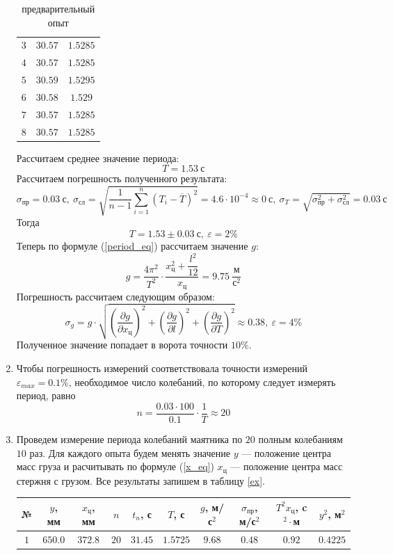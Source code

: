 \documentclass[12pt]{article}
\begin{document}
\begin{enumerate}[label={\textbf{\arabic*.}}]
\begin{table}[h]
\begin{tabular}{|c|c|c|}
				$3$ & $30.57$ &	$1.5285$ \\
				$4$ & $30.57$ &	$1.5285$ \\
				$5$ & $30.59$ &	$1.5295$ \\
				$6$ & $30.58$ &	$1.529$  \\
				$7$ & $30.57$ &	$1.5285$ \\
				$8$ & $30.57$ &	$1.5285$ \\ \hline	
			\end{tabular}
			\caption{предварительный опыт}
			\label{null_ex}
		\end{table}
		Рассчитаем среднее значение периода:
		$$
		T = 1.53~\text{с}
		$$
		Рассчитаем погрешность полученного результата:
		$$
		\sigma_{\text{пр}} = 0.03~\text{с},~\sigma_{\text{сл}} = \sqrt{\frac{1}{n-1}\sum_{i=1}^n \left(T_i - \overline{T}\right)^2} = 4.6\cdot10^{-4} \approx 0~\text{с},~\sigma_T = \sqrt{\sigma_{\text{пр}}^2 + \sigma_{\text{сл}}^2} = 0.03~\text{с}
		$$
		Тогда
		$$
		T = 1.53\pm0.03~\text{с},~\varepsilon = 2\%
		$$
		Теперь по формуле (\ref{period_eq}) рассчитаем значение $g$:
		$$
		g = \frac{4\pi^2}{T^2}\cdot\frac{x_\text{ц}^2+\dfrac{l^2}{12}}{x_\text{ц}} = 9.75~\frac{\text{м}}{\text{с}^2}
		$$
		Погрешность рассчитаем следующим образом:
		$$
		\sigma_g = g\cdot\sqrt{\left(\frac{\partial g}{\partial x_\text{ц}}\right)^2 + \left(\frac{\partial g}{\partial l}\right)^2 + \left(\frac{\partial g}{\partial T}\right)^2} \approx 0.38,~\varepsilon = 4\%
		$$
		Полученное значение попадает в ворота точности $10\%$.
		\item Чтобы погрешность измерений соответствовала точности измерений $\varepsilon_{max} = 0.1\%$, необходимое число колебаний, по которому следует измерять период, равно
		$$
		n = \frac{0.03\cdot100}{0.1} \cdot\frac{1}{T} \approx 20
		$$
		\item Проведем измерение периода колебаний маятника по $20$ полным колебаниям $10$ раз. Для каждого опыта будем менять значение $y$ --- положение центра масс груза и расчитывать по формуле (\ref{x_eq}) $x_{\text{ц}}$ --- положение центра масс стержня с грузом. Все результаты запишем в таблицу \ref{ex}.
		\begin{table}[h]
			\centering
			\begin{tabular}{|c|c|c|c|c|c|c|c|c|c|}\hline
				№  & $y$,  мм & $x_{\text{ц}}$, мм & $n$ & $t_n$, с & $T$, с & $g$, м/с$^2$ & $\sigma_{\text{пр}}$, м/с$^2$ & $T^2x_{\text{ц}}$, c$^2\cdot$м & $y^2$, м$^2$ \\ \hline
				$1$	 & $650.0$ & $372.8$ & $20$ & $31.45$ & $1.5725$ & $9.68$ & $0.48$ & $0.92$ & $0.4225$ \\

\end{tabular}
\end{table}
\end{enumerate}
\end{document}
